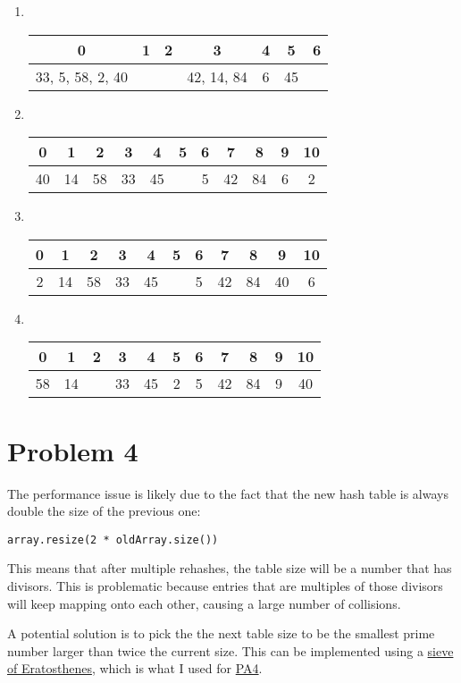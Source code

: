 \documentclass[12pt]{article}
\theoremstyle{definition}
\begin{document}
\begin{enumerate}[label=(\alph*)]
  \item
    ~\\
    \begin{tabular}{|c|c|c|c|c|c|c|}
      \hline
      0 & 1 & 2 & 3 & 4 & 5 & 6 \\ [0.5ex]
      \hline
      33, 5, 58, 2, 40 & & & 42, 14, 84 & 6 & 45 & \\
      \hline
    \end{tabular}
  \item
    ~\\
    \begin{tabular}{|c|c|c|c|c|c|c|c|c|c|c|}
      \hline
      0 & 1 & 2 & 3 & 4 & 5 & 6 & 7 & 8 & 9 & 10 \\ [0.5ex]
      \hline
      40 & 14 & 58 & 33 & 45 & & 5 & 42 & 84 & 6 & 2 \\
      \hline
    \end{tabular}
  \item
    ~\\
    \begin{tabular}{|c|c|c|c|c|c|c|c|c|c|c|}
      \hline
      0 & 1 & 2 & 3 & 4 & 5 & 6 & 7 & 8 & 9 & 10 \\ [0.5ex]
      \hline
      2 & 14 & 58 & 33 & 45 & & 5 & 42 & 84 & 40 & 6 \\
      \hline
    \end{tabular}
  \item
    ~\\
    \begin{tabular}{|c|c|c|c|c|c|c|c|c|c|c|}
      \hline
      0 & 1 & 2 & 3 & 4 & 5 & 6 & 7 & 8 & 9 & 10 \\ [0.5ex]
      \hline
      58 & 14 & & 33 & 45 & 2 & 5 & 42 & 84 & 9 & 40 \\
      \hline
    \end{tabular}
\end{enumerate}

\section{Problem 4}

The performance issue is likely due to the fact that the new hash
table is always double the size of the previous one:

\begin{verbatim}
array.resize(2 * oldArray.size())
\end{verbatim}

This means that after multiple rehashes, the table size will be a
number that has divisors. This is problematic because entries that
are multiples of those divisors will keep mapping onto each other,
causing a large number of collisions.

A potential solution is to pick the the next table size to be the
smallest prime number larger than twice the current size. This can be
implemented using a
\href{https://en.wikipedia.org/wiki/Sieve_of_Eratosthenes}{sieve of
Eratosthenes}, which is what I used for
\href{https://github.com/mathletedev/cpt_s/blob/b7051f9f4cdd25d00f1a66aae65da3f2133e4883/223/assignments/pa4/src/hash_map.hpp#L57}{PA4}.
\end{document}
